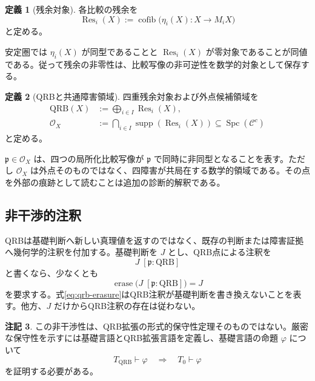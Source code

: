 \documentclass[a4paper,11pt]{ltjsarticle}
\theoremstyle{definition}
\newtheorem{definition}{定義}[section]
\newtheorem{remark}[definition]{注記}
\theoremstyle{plain}
\newcommand{\QRB}{\mathrm{QRB}}
\newcommand{\Res}{\operatorname{Res}}
\newcommand{\cofib}{\operatorname{cofib}}
\newcommand{\supp}{\operatorname{supp}}
\newcommand{\Spc}{\operatorname{Spc}}
\newcommand{\erase}{\operatorname{erase}}
\begin{document}
\begin{definition}[残余対象]
各比較の残余を
\begin{equation}
 \Res_i(X)
 :=\cofib\bigl(\eta_i(X):X\to M_iX\bigr)
 \label{eq:qrb-residual-inspection}
\end{equation}
と定める。
\end{definition}

安定圏では $\eta_i(X)$ が同型であることと $\Res_i(X)$ が零対象であることが同値である。従って残余の非零性は、比較写像の非可逆性を数学的対象として保存する。

\begin{definition}[QRBと共通障害領域]
四重残余対象および外点候補領域を
\begin{align}
 \QRB(X)
 &:={\bigoplus}_{i\in I}\Res_i(X),\\
 \mathcal O_X
 &:={\bigcap}_{i\in I}\supp(\Res_i(X))
 \subseteq\Spc(\mathcal C^c)
 \label{eq:qrb-locus-inspection}
\end{align}
と定める\cite{balmer}。
\end{definition}

$\mathfrak p\in\mathcal O_X$ は、四つの局所化比較写像が $\mathfrak p$ で同時に非同型となることを表す。ただし $\mathcal O_X$ は外点そのものではなく、四障害が共局在する数学的領域である。その点を外部の痕跡として読むことは追加の診断的解釈である。

\subsection{非干渉的注釈}

QRBは基礎判断へ新しい真理値を返すのではなく、既存の判断または障害証拠へ幾何学的注釈を付加する。基礎判断を $J$ とし、QRB点による注釈を
\begin{equation}
 J\;[\mathfrak p:\QRB]
\end{equation}
と書くなら、少なくとも
\begin{equation}
 \erase\bigl(J\;[\mathfrak p:\QRB]\bigr)=J
 \label{eq:qrb-erasure}
\end{equation}
を要求する。式\eqref{eq:qrb-erasure}はQRB注釈が基礎判断を書き換えないことを表す。他方、$J$ だけからQRB注釈の存在は従わない。

\begin{remark}
この非干渉性は、QRB拡張の形式的保守性定理そのものではない。厳密な保守性を示すには基礎言語とQRB拡張言語を定義し、基礎言語の命題 $\varphi$ について
\begin{equation}
 T_{\QRB}\vdash\varphi
 \quad\Longrightarrow\quad
 T_0\vdash\varphi
\end{equation}
を証明する必要がある。
\end{remark}
\end{document}
